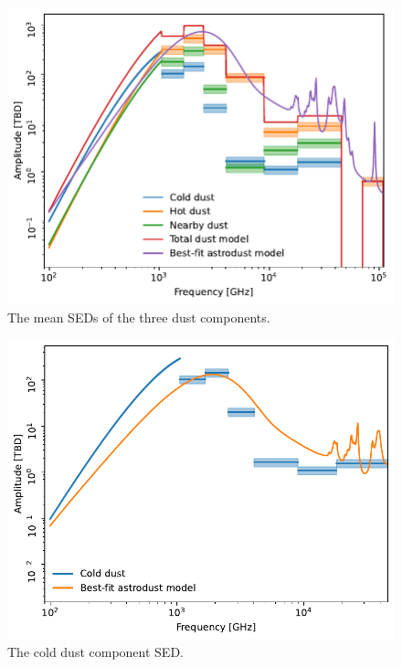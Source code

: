 \documentclass{aa}
\begin{document}
\begin{figure}
  \centering
  \includegraphics[width=\columnwidth]{figures/all_components_sed.pdf}
  \caption{The mean SEDs of the three dust components.}
  \label{fig:all_components_sed}
\end{figure}
\begin{figure}
  \centering
  \includegraphics[width=\columnwidth]{figures/cold_dust_sed.pdf}
  \caption{The cold dust component SED.}
  \label{fig:cold_dust_sed}
\end{figure}
\end{document}
